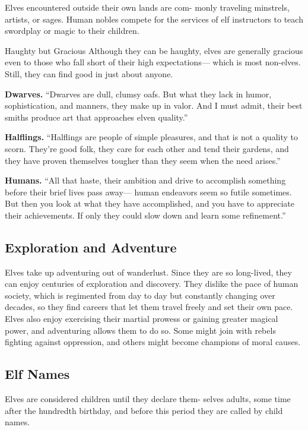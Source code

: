 Elves encountered outside their own lands are com- monly traveling minstrels, artists, or sages. Human nobles compete for the services of elf instructors to teach swordplay or magic to their children.

\begin{DndSidebar}[float=!b]{Haughty but Gracious}
Although they can be haughty, elves are generally gracious even to those who fall short of their high expectations— which is most non-elves. Still, they can find good in just about anyone.

\textbf{Dwarves.} ``Dwarves are dull, clumsy oafs. But what they lack in humor, sophistication, and manners, they make up in valor. And I must admit, their best smiths produce art that approaches elven quality.''

\textbf{Halflings.} ``Halflings are people of simple pleasures, and that is not a quality to scorn. They’re good folk, they care for each other and tend their gardens, and they have proven themselves tougher than they seem when the need arises.''

\textbf{Humans.} ``All that haste, their ambition and drive to accomplish something before their brief lives pass away— human endeavors seem so futile sometimes. But then you look at what they have accomplished, and you have to appreciate their achievements. If only they could slow down and learn some refinement.''
\end{DndSidebar}

\subsection{Exploration and Adventure}
Elves take up adventuring out of wanderlust. Since they are so long-lived, they can enjoy centuries of exploration and discovery. They dislike the pace of human society, which is regimented from day to day but constantly changing over decades, so they find careers that let them travel freely and set their own pace. Elves also enjoy exercising their martial prowess or gaining greater magical power, and adventuring allows them to do so. Some might join with rebels fighting against oppression, and others might become champions of moral causes.

\subsection{Elf Names}
Elves are considered children until they declare them- selves adults, some time after the hundredth birthday, and before this period they are called by child names.

